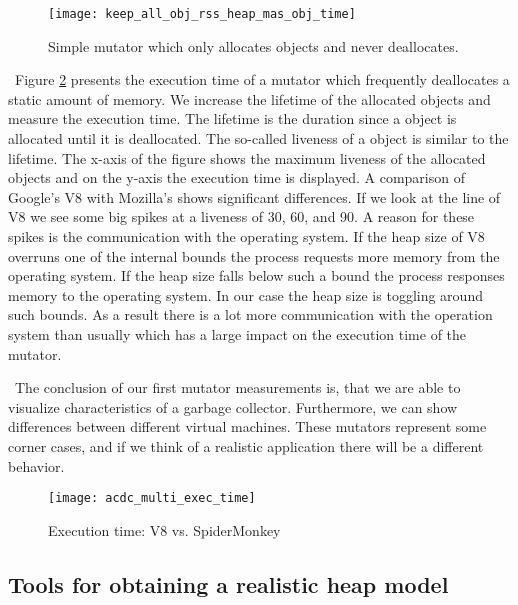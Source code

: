 \begin{figure}
	\centering
	\texttt{[image: keep\_all\_obj\_rss\_heap\_mas\_obj\_time]}
	\caption{Simple mutator which only allocates objects and never deallocates.}
	\label{fig:mutator_keep_all_obj}
\end{figure}

\
Figure \ref{fig:acdc_multi_exec_time} presents the execution time of a mutator which frequently deallocates a static amount of memory. We increase the lifetime of the allocated objects and measure the execution time. The lifetime is the duration since a object is allocated until it is deallocated. The so-called liveness of a object is similar to the lifetime. The x-axis of the figure shows the maximum liveness of the allocated objects and on the y-axis the execution time is displayed. A comparison of Google's V8 with Mozilla's \SM shows significant differences. If we look at the line of V8 we see some big spikes at a liveness of 30, 60, and 90. A reason for these spikes is the communication with the operating system. If the heap size of V8 overruns one of the internal bounds the process requests more memory from the operating system. If the heap size falls below such a bound the process responses memory to the operating system. In our case the heap size is toggling around such bounds. As a result there is a lot more communication with the operation system than usually which has a large impact on the execution time of the mutator.

\
The conclusion of our first mutator measurements is, that we are able to visualize characteristics of a garbage collector. Furthermore, we can show differences between different virtual machines. These mutators represent some corner cases, and if we think of a realistic \JS application there will be a different behavior.

\begin{figure}
	\centering
	\texttt{[image: acdc\_multi\_exec\_time]}
	\caption{Execution time: V8 vs. SpiderMonkey}
	\label{fig:acdc_multi_exec_time}
\end{figure}



\subsection{Tools for obtaining a realistic heap model}


